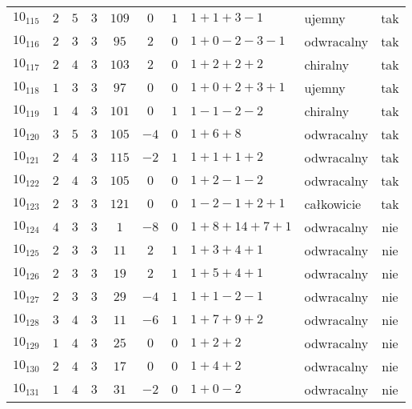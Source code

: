 \begin{longtable}{lccccccllc}
$10_{115}$  &  $2$     &  $5$  &  $3$      &  $109$  &  $0$   &  $1$  &  $1+1+3-1$      &  ujemny      &  tak  \\
$10_{116}$  &  $2$     &  $3$  &  $3$      &  $95$   &  $2$   &  $0$  &  $1+0-2-3-1$    &  odwracalny  &  tak  \\
$10_{117}$  &  $2$     &  $4$  &  $3$      &  $103$  &  $2$   &  $0$  &  $1+2+2+2$      &  chiralny    &  tak  \\
$10_{118}$  &  $1$     &  $3$  &  $3$      &  $97$   &  $0$   &  $0$  &  $1+0+2+3+1$    &  ujemny      &  tak  \\
$10_{119}$  &  $1$     &  $4$  &  $3$      &  $101$  &  $0$   &  $1$  &  $1-1-2-2$      &  chiralny    &  tak  \\
$10_{120}$  &  $3$     &  $5$  &  $3$      &  $105$  &  $-4$  &  $0$  &  $1+6+8$        &  odwracalny  &  tak  \\
$10_{121}$  &  $2$     &  $4$  &  $3$      &  $115$  &  $-2$  &  $1$  &  $1+1+1+2$      &  odwracalny  &  tak  \\
$10_{122}$  &  $2$     &  $4$  &  $3$      &  $105$  &  $0$   &  $0$  &  $1+2-1-2$      &  odwracalny  &  tak  \\
$10_{123}$  &  $2$     &  $3$  &  $3$      &  $121$  &  $0$   &  $0$  &  $1-2-1+2+1$    &  całkowicie  &  tak  \\
$10_{124}$  &  $4$     &  $3$  &  $3$      &  $1$    &  $-8$  &  $0$  &  $1+8+14+7+1$   &  odwracalny  &  nie  \\
$10_{125}$  &  $2$     &  $3$  &  $3$      &  $11$   &  $2$   &  $1$  &  $1+3+4+1$      &  odwracalny  &  nie  \\
$10_{126}$  &  $2$     &  $3$  &  $3$      &  $19$   &  $2$   &  $1$  &  $1+5+4+1$      &  odwracalny  &  nie  \\
$10_{127}$  &  $2$     &  $3$  &  $3$      &  $29$   &  $-4$  &  $1$  &  $1+1-2-1$      &  odwracalny  &  nie  \\
$10_{128}$  &  $3$     &  $4$  &  $3$      &  $11$   &  $-6$  &  $1$  &  $1+7+9+2$      &  odwracalny  &  nie  \\
$10_{129}$  &  $1$     &  $4$  &  $3$      &  $25$   &  $0$   &  $0$  &  $1+2+2$        &  odwracalny  &  nie  \\
$10_{130}$  &  $2$     &  $4$  &  $3$      &  $17$   &  $0$   &  $0$  &  $1+4+2$        &  odwracalny  &  nie  \\
$10_{131}$  &  $1$     &  $4$  &  $3$      &  $31$   &  $-2$  &  $0$  &  $1+0-2$        &  odwracalny  &  nie  \\

\end{longtable}
